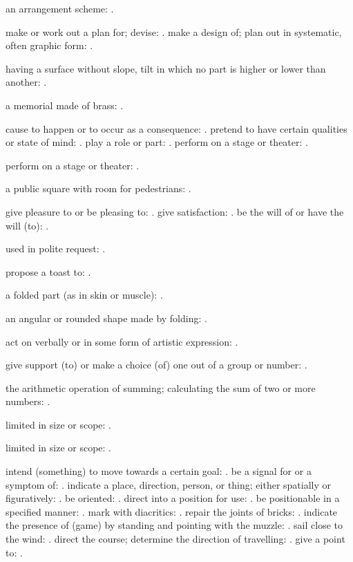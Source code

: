   an arrangement scheme: .

  make or work out a plan for; devise: . make a design of; plan out in systematic, often graphic form: .

  having a surface without slope, tilt in which no part is higher or lower than another: .

  a memorial made of brass: .

  cause to happen or to occur as a consequence: . pretend to have certain qualities or state of mind: . play a role or part: . perform on a stage or theater: .

  perform on a stage or theater: .

  a public square with room for pedestrians: .

  give pleasure to or be pleasing to: . give satisfaction: . be the will of or have the will (to): .

  used in polite request: .

  propose a toast to: .

  a folded part (as in skin or muscle): .

  an angular or rounded shape made by folding: .

  act on verbally or in some form of artistic expression: .

  give support (to) or make a choice (of) one out of a group or number: .

  the arithmetic operation of summing; calculating the sum of two or more numbers: .

  limited in size or scope: .

  limited in size or scope: .

  intend (something) to move towards a certain goal: . be a signal for or a symptom of: . indicate a place, direction, person, or thing; either spatially or figuratively: . be oriented: . direct into a position for use: . be positionable in a specified manner: . mark with diacritics: . repair the joints of bricks: . indicate the presence of (game) by standing and pointing with the muzzle: . sail close to the wind: . direct the course; determine the direction of travelling: . give a point to: .

